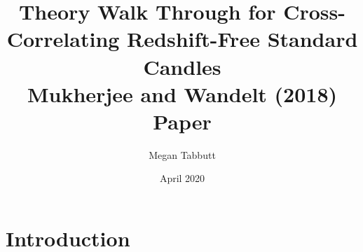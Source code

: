 \documentclass{article}%
\title{ {\bf Theory Walk Through for Cross-Correlating Redshift-Free Standard Candles} \\ 
Mukherjee and Wandelt (2018) Paper}
\date{April 2020}
\author{Megan Tabbutt}
\begin{document}
\maketitle


\section{Introduction}
\end{document}
